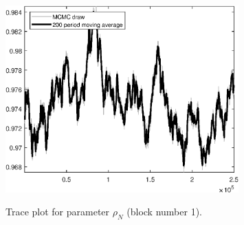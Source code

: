 \begin{figure}[H]
\centering
  \includegraphics[width=0.8\textwidth]{BRS_growth_ext_util/graphs/TracePlot_rho_N_blck_1}\\
    \caption{Trace plot for parameter ${\rho_N}$ (block number 1).}
\end{figure}
